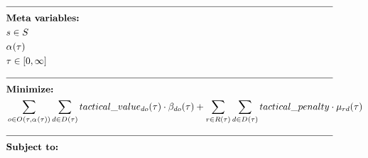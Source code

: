 \newpage
\begin{alignat}{2}
	& \text{\rule{\linewidth}{0.4pt}} \notag\\
	& \textbf{Meta variables:}                                                                                                                                                                                                                                                             \notag\\
	& \ElementScheduler \in \SetScheduler                                                                                                                                                                                                                                                    \\
	& \VarStrategicWorkOrderAssignment{}{}                                                                                                                                                                                                                                                 \\
	& \tau \in [0, \infty]                                                                                                                                                                                                                                                                 \\
	& \text{\rule{\linewidth}{0.4pt}} \notag\\
	& \textbf{Minimize:}                                                                                                                                                                                                                                                                   \notag\\
	& \sum_{\ElementOperation \in \SetOperation{}{\VarStrategicWorkOrderAssignment{}{}}} \sum_{\ElementDays \in \SetDays{}} \ParTacticalValue \cdot \VarTacticalWork{\ElementDays}{\ElementOperation} + \sum_{r \in \SetResource} \sum_{\ElementDays \in \SetDays{}} \ParTacticalPenalty \cdot \VarTacticalExcess                                                                                                                                                                                \\  
	& \text{\rule{\linewidth}{0.4pt}} \notag\\
	& \textbf{Subject to:}                                                                                                                                                                                                                                                                 \notag\\

\end{alignat}
